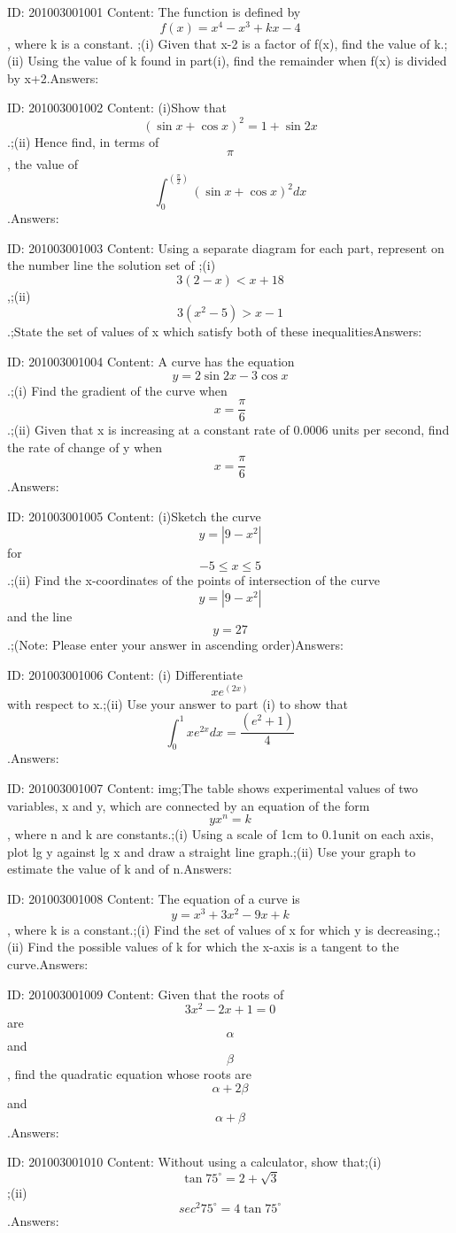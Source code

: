 \documentclass{article}
\begin{document}
ID: 201003001001
Content:
The function is defined by $$f(x) = x^4 -x^3+kx-4$$, where k is a constant. ;(i) Given that x-2 is a factor of f(x), find the value of k.;(ii) Using the value of k found in part(i), find the remainder when f(x) is divided by x+2.Answers:

ID: 201003001002
Content:
(i)Show that $$(\sin  x+ \cos  x)^2 = 1+\sin 2x$$.;(ii) Hence find, in terms of $$\pi$$, the value of $$\int_0^{( \frac{\pi }{2})} (\sin  x+\cos x)^2 dx$$.Answers:

ID: 201003001003
Content:
Using a separate diagram for each part, represent on the number line the solution set of ;(i) $$3(2-x) < x+18$$,;(ii) $$3(x^2 -5) > x-1$$ .;State the set of values of x which satisfy both of these inequalitiesAnswers:

ID: 201003001004
Content:
A curve has the equation $$y =2\sin 2x -3\cos x$$.;(i) Find the gradient of the curve when $$x= \frac{\pi }{6}$$.;(ii) Given that x is increasing at a constant rate of 0.0006 units per second, find the rate of change of y when $$x= \frac{\pi }{6}$$.Answers:

ID: 201003001005
Content:
(i)Sketch the curve $$y = |9-x^2|$$ for $$-5\leq x\leq5$$.;(ii) Find the x-coordinates of the points of intersection of the curve $$y=|9-x^2|$$ and the line $$y=27$$.;(Note: Please enter your answer in ascending order)Answers:

ID: 201003001006
Content:
(i) Differentiate $$xe^{(2x)}$$ with respect to x.;(ii) Use your answer to part (i) to show that $$\int_0^1 xe^{2x} dx = \frac{(e^2+1)}{4}$$.Answers:

ID: 201003001007
Content:
img;The table shows experimental values of two variables, x and y, which are connected by an equation of the form $$yx^n=k$$, where n and k are constants.;(i) Using a scale of 1cm to 0.1unit on each axis, plot lg y against lg x and draw a straight line graph.;(ii) Use your graph to estimate the value of k and of n.Answers:

ID: 201003001008
Content:
The equation of a curve is $$y =x^3+3x^2-9x+k$$, where k is a constant.;(i) Find the set of values of x for which y is decreasing.;(ii) Find the possible values of k for which the x-axis is a tangent to the curve.Answers:

ID: 201003001009
Content:
Given that the roots of $$3x^2-2x+1=0$$ are $$\alpha$$ and $$\beta$$, find the quadratic equation whose roots are $$\alpha + 2\beta$$ and $$\alpha + \beta$$.Answers:

ID: 201003001010
Content:
Without using a calculator, show that;(i) $$\tan  75^{\circ} = 2+ \sqrt{3}$$;(ii) $$sec^2 75^{\circ} =4 \tan  75^{\circ}$$.Answers:
\end{document}
